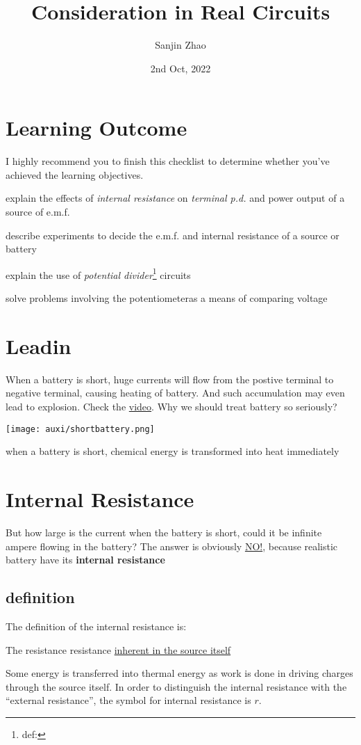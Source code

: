 \documentclass[a4paper]{tufte-handout}
\title{Consideration in Real Circuits}
\author{Sanjin Zhao}
\date{2nd Oct, 2022}  %
\newenvironment{SummBox}
{\begin{tcolorbox}[breakable,colback=r1!30,colframe=r1,title=Summary]} {\end{tcolorbox}}
\begin{document}
\maketitle%
\section*{Learning Outcome}
I highly recommend you to finish this checklist to determine whether you've achieved the learning objectives.
\begin{todolist}
  \item explain the effects of \emph{internal resistance} on \emph{terminal p.d.} and power output of a source of e.m.f.
  \item describe experiments to decide the e.m.f. and internal resistance of a source or battery
  \item explain the use of \emph{potential divider}\footnote{def:} circuits
  \item solve problems involving the potentiometeras a means of comparing voltage
\end{todolist}
\clearpage

\section{Leadin}
When a battery is short, huge currents will flow from the postive terminal to negative terminal, causing heating of battery. And such accumulation may even lead to explosion. Check the \href{https://www.bilibili.com/video/BV1FK4y1S7NM}{video}. Why we should treat battery so seriously?
\begin{marginfigure}
\centering
\texttt{[image: auxi/shortbattery.png]}
\caption{when a battery is short, chemical energy is transformed into heat immediately}
\end{marginfigure}

\section{Internal Resistance}
But how large is the current when the battery is short, could it be infinite ampere flowing in the battery? The answer is obviously \uline{NO!}, because realistic battery have its \textbf{internal resistance}

\subsection{definition}
The definition of the internal resistance is:
\begin{SummBox}
The resistance resistance \uline{inherent in the source itself} 
\end{SummBox}
Some energy is transferred into thermal energy as work is done in driving charges through the source itself.
In order to distinguish the internal resistance with the ``external resistance'', the symbol for internal resistance is $r$. 
\end{document}
